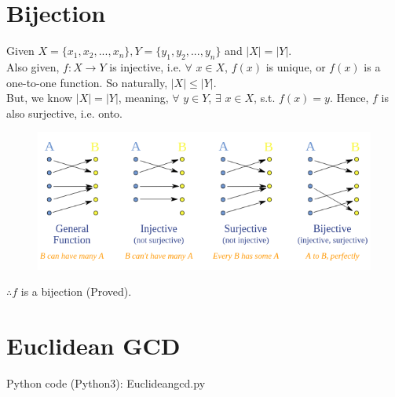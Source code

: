 \documentclass[12pt]{article}
\begin{document}
\section{Bijection}
\begin{large}
Given $X = \{x_{1}, x_{2},..., x_{n}\}, Y = \{y_{1}, y_{2},..., y_{n}\}$ and $|X| = |Y|$.\\
Also given, $f: X \to Y$ is injective, i.e. $\forall$ $x \in X$, $f(x)$ is unique, or $f(x)$ is a one-to-one function. So naturally, $|X| \le |Y|$.\\
But, we know $|X| = |Y|$, meaning, $\forall$ $y \in Y$, $\exists$ $x \in X$, s.t. $f(x) = y$. Hence, $f$ is also surjective, i.e. onto.\\
\begin{figure}[h!]
\centering\includegraphics[width = 0.75\linewidth]{./images/HW2_1.png}
\end{figure}
$\therefore f$ is a bijection (Proved).
\end{large}

\section{Euclidean GCD}
Python code (Python3): Euclidean\textunderscore gcd.py

\end{document}
